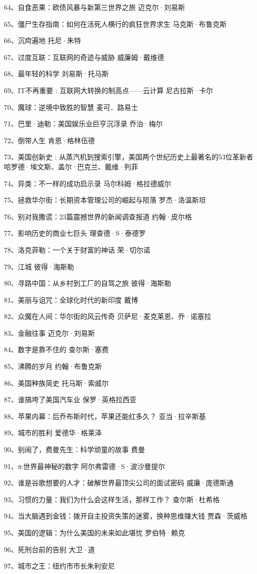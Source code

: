 64、自食恶果：欧债风暴与新第三世界之旅 迈克尔·刘易斯

65、僵尸生存指南：如何在活死人横行的疯狂世界求生 马克斯·布鲁克斯

66、沉疴遍地 托尼·朱特

67、过度互联：互联网的奇迹与威胁 威廉姆·戴维德

68、最年轻的科学 刘易斯·托马斯

69、IT不再重要 : 互联网大转换的制高点------云计算 尼古拉斯·卡尔

70、魔球：逆境中致胜的智慧 麦可．路易士

71、巴里·迪勒：美国娱乐业巨亨沉浮录 乔治·梅尔

72、倒带人生 肯恩·格林伍德

73、美国创新史 :
从蒸汽机到搜索引擎，美国两个世纪历史上最著名的53位革新者
哈罗德·埃文斯、盖尔·巴克兰、戴维·列菲

74、异类：不一样的成功启示录 马尔科姆·格拉德威尔

75、拯救华尔街：长期资本管理公司的崛起与陨落 罗杰·洛温斯坦

76、别对我撒谎：23篇震撼世界的新闻调查报道 约翰·皮尔格

77、影响历史的商业七巨头 理查德·S·泰德罗

78、洛克菲勒：一个关于财富的神话 荣·切尔诺

79、江城 彼得·海斯勒

80、寻路中国：从乡村到工厂的自驾之旅 彼得·海斯勒

81、美丽与诅咒：全球化时代的新印度 戴博

82、众魔在人间：华尔街的风云传奇 贝萨尼·麦克莱恩、乔·诺塞拉

83、金融往事 迈克尔·刘易斯

84、数字是靠不住的 查尔斯·塞费

85、沸腾的岁月 约翰·布鲁克斯

86、美国种族简史 托马斯·索威尔

87、谁搞垮了美国汽车业 保罗·英格拉西亚

88、苹果内幕：后乔布斯时代，苹果还能红多久？ 亚当·拉辛斯基

89、城市的胜利 爱德华·格莱泽

90、别闹了，费曼先生：科学顽童的故事 费曼

91、π:世界最神秘的数字 阿尔弗雷德·S·波沙曼提尔

92、谁是谷歌想要的人才：破解世界最顶尖公司的面试密码 威廉·庞德斯通

93、习惯的力量：我们为什么会这样生活，那样工作？ 查尔斯·杜希格

94、当大脑遇到金钱：拨开自主投资失策的迷雾，换种思维赚大钱 贾森·茨威格

95、美国的逻辑：为什么美国的未来如此堪忧 罗伯特·赖克

96、死刑台前的告别 大卫·道

97、城市之王：纽约市市长朱利安尼
